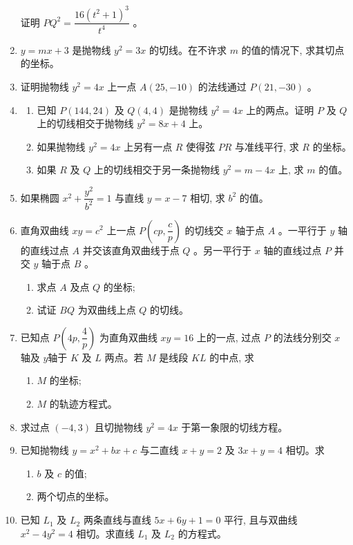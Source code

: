 \documentclass[10pt]{article}
\begin{document}
\begin{enumerate}
  证明 $PQ^{2}=\dfrac{16\left(t^{2}+1\right)^{3}}{t^{4}}$ 。
  \item $y=m x+3$ 是抛物线 $y^{2}=3 x$ 的切线。在不许求 $m$ 的值的情况下, 求其切点的坐标。
  \item 证明抛物线 $y^{2}=4 x$ 上一点 $A(25,-10)$ 的法线通过 $P(21,-30)$ 。
  \item \begin{enumerate}
    \item 已知 $P(144,24)$ 及 $Q(4,4)$ 是抛物线 $y^{2}=4 x$ 上的两点。证明 $P$ 及 $Q$ 上的切线相交于抛物线 $y^{2}=8 x+4$ 上。
    \item 如果抛物线 $y^{2}=4 x$ 上另有一点 $R$ 使得弦 $PR$ 与准线平行, 求 $R$ 的坐标。
    \item 如果 $R$ 及 $Q$ 上的切线相交于另一条抛物线 $y^{2}=m-4 x$ 上, 求 $m$ 的值。
  \end{enumerate}
  \item 如果椭圆 $x^{2}+\dfrac{y^{2}}{b^{2}}=1$ 与直线 $y=x-7$ 相切, 求 $b^{2}$ 的值。
  \item 直角双曲线 $x y=c^{2}$ 上一点 $P\left(c p, \dfrac{c}{p}\right)$ 的切线交 $x$ 轴于点 $A$ 。一平行于 $y$ 轴的直线过点 $A$ 并交该直角双曲线于点 $Q$ 。另一平行于 $x$ 轴的直线过点 $P$ 并交 $y$ 轴于点 $B$ 。
  \begin{enumerate}
    \item 求点 $A$ 及点 $Q$ 的坐标;
    \item 试证 $B Q$ 为双曲线上点 $Q$ 的切线。
  \end{enumerate}
  \item 已知点 $P\left(4 p, \dfrac{4}{p}\right)$ 为直角双曲线 $x y=16$ 上的一点, 过点 $P$ 的法线分别交 $x$ 轴及 $y$轴于 $K$ 及 $L$ 两点。若 $M$ 是线段 $K L$ 的中点, 求
  \begin{enumerate}
    \item $M$ 的坐标;
    \item $M$ 的轨迹方程式。
  \end{enumerate}
  \item 求过点 $(-4,3)$ 且切抛物线 $y^{2}=4 x$ 于第一象限的切线方程。
  \item 已知抛物线 $y=x^{2}+b x+c$ 与二直线 $x+y=2$ 及 $3 x+y=4$ 相切。求
  \begin{enumerate}
    \item $b$ 及 $c$ 的值;
    \item 两个切点的坐标。
  \end{enumerate}
  \item 已知 $L_{1}$ 及 $L_{2}$ 两条直线与直线 $5 x+6 y+1=0$ 平行, 且与双曲线 $x^{2}-4 y^{2}=4$ 相切。求直线 $L_{1}$ 及 $L_{2}$ 的方程式。


\end{enumerate}
\end{document}
